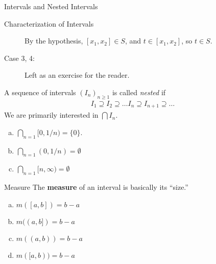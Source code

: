 \documentclass[10pt]{extarticle}
\begin{document}
\begin{problem}{Intervals and Nested Intervals}
\begin{problem}{Characterization of Intervals}
\begin{description}
          By the hypothesis, $[x_1,x_2]\in S$, and $t\in [x_1,x_2]$, so $t\in S$.
        \item[Case 3, 4:] Left as an exercise for the reader.
      \end{description}
    \end{problem}
    A sequence of intervals $(I_n)_{n \geq 1}$ is called \textsl{nested} if
    \begin{align*}
      I_1 \supseteq I_2 \supseteq \dots I_n \supseteq I_{n+1} \supseteq\dots
    \end{align*}
    We are primarily interested in $\bigcap I_n$.
    \begin{enumerate}[(a)]
      \item $\bigcap_{n=1}[0,1/n) = \{0\}$.
      \item $\bigcap_{n=1}(0,1/n) = \emptyset$
      \item $\bigcap_{n=1}[n,\infty) = \emptyset$
    \end{enumerate}
  \end{problem}
  \begin{problem}{Measure}
    The \textbf{measure} of an interval is basically its ``size.''
    \begin{enumerate}[(a)]
      \item $m([a,b]) = b-a$
      \item $m((a,b]) = b-a$
      \item $m((a,b)) = b-a$
      \item $m([a,b)) = b-a$
    \end{enumerate}
  \end{problem}
\end{document}
